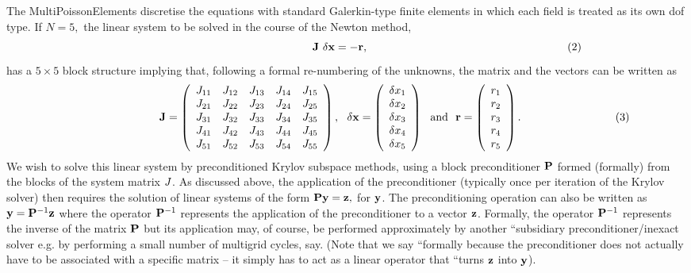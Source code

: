 The {\ttfamily Multi\+Poisson\+Elements} discretise the equations with standard Galerkin-\/type finite elements in which each field is treated as its own dof type. If $ N = 5, $ the linear system to be solved in the course of the Newton method, \[ \ \ \ \ \ \ \ \ \ \ \ \ \ \ \ \ \ \ \ \ \ \ \ \ \ \ \ \ \ \ \ \ \ \ \ \ \ \ \ \ \ \ \ \ \ \ \ \ \ \ \ \ \ \ {\bf J} \ \delta {\bf x} = -{\bf r}, \ \ \ \ \ \ \ \ \ \ \ \ \ \ \ \ \ \ \ \ \ \ \ \ \ \ \ \ \ \ \ \ \ \ \ \ \ \ \ \ \ \ \ \ \ \ \ \ \ \ \ \ \ \ (2) \] has a $5 \times 5$ block structure implying that, following a formal re-\/numbering of the unknowns, the matrix and the vectors can be written as \[ \hspace{3cm} {\bf J} = \left( \begin{array}{ccccc} J_{11} & J_{12} & J_{13} & J_{14} & J_{15} \\ J_{21} & J_{22} & J_{23} & J_{24} & J_{25} \\ J_{31} & J_{32} & J_{33} & J_{34} & J_{35} \\ J_{41} & J_{42} & J_{43} & J_{44} & J_{45} \\ J_{51} & J_{52} & J_{53} & J_{54} & J_{55} \\ \end{array} \right), \ \ \delta {\bf x} = \left( \begin{array}{c} \delta x_{1} \\ \delta x_{2} \\ \delta x_{3} \\ \delta x_{4} \\ \delta x_{5} \\ \end{array} \right) \ \mbox{ and } \ {\bf r} = \left( \begin{array}{c} r_{1} \\ r_{2} \\ r_{3} \\ r_{4} \\ r_{5} \\ \end{array} \right). \hspace{3cm} (3) \] We wish to solve this linear system by preconditioned Krylov subspace methods, using a block preconditioner ${\bf P}$ formed (formally) from the blocks of the system matrix ${\bf }J$. As discussed above, the application of the preconditioner (typically once per iteration of the Krylov solver) then requires the solution of linear systems of the form $ {\bf P} {\bf y} = {\bf z}, $ for ${\bf y}$. The preconditioning operation can also be written as $ {\bf y} = {\bf P}^{-1} {\bf z} $ where the operator ${\bf P}^{-1}$ represents the application of the preconditioner to a vector ${\bf z}$. Formally, the operator ${\bf P}^{-1}$ represents the inverse of the matrix ${\bf P}$ but its application may, of course, be performed approximately by another ``subsidiary\textquotesingle{}\textquotesingle{} preconditioner/inexact solver e.\+g. by performing a small number of multigrid cycles, say. (Note that we say ``formally\textquotesingle{}\textquotesingle{} because the preconditioner does not actually have to be associated with a specific matrix -- it simply has to act as a linear operator that ``turns ${\bf z}$ into ${\bf y}$\textquotesingle{}\textquotesingle{}).

